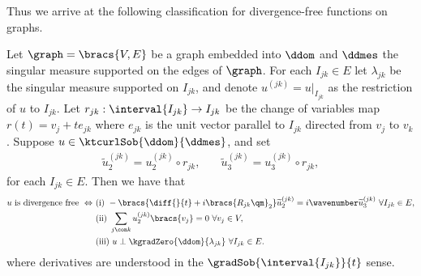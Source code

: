 Thus we arrive at the following classification for divergence-free functions on graphs.
\begin{cory} \label{cory:DivFreeWholeGraph}
	Let $\graph=\bracs{V,E}$ be a graph embedded into $\ddom$ and $\ddmes$ the singular measure supported on the edges of $\graph$.
	For each $I_{jk}\in E$ let $\lambda_{jk}$ be the singular measure supported on $I_{jk}$, and denote $u^{(jk)} = u\vert_{I_{jk}}$ as the restriction of $u$ to $I_{jk}$.
	Let $r_{jk}:\interval{I_{jk}}\rightarrow I_{jk}$ be the change of variables map $r(t)=v_{j} + te_{jk}$ where $e_{jk}$ is the unit vector parallel to $I_{jk}$ directed from $v_j$ to $v_k$.
	Suppose $u\in\ktcurlSob{\ddom}{\ddmes}$, and set 
	\begin{align*}
		\widetilde{u}^{(jk)}_2 = u^{(jk)}_2 \circ r_{jk},
		&\quad \widetilde{u}^{(jk)}_3 = u^{(jk)}_3 \circ r_{jk},
	\end{align*}
	for each $I_{jk}\in E$.
	Then we have that
	\begin{align*}
		u \text{ is divergence free } \Leftrightarrow 
		& \ \text{(i)} \ -\bracs{\diff{}{t} + i\bracs{R_{jk}\qm}_2}\widetilde{u}^{(jk)}_2 = i\wavenumber\widetilde{u}^{(jk)}_3 \ \forall I_{jk}\in E, \\
		& \ \text{(ii)} \ \sum_{j\con k}u_2^{(jk)}\bracs{v_j} = 0 \ \forall v_j\in V, \\
		& \ \text{(iii)} \ u \perp \kgradZero{\ddom}{\lambda_{jk}} \ \forall I_{jk}\in E.
	\end{align*}
	where derivatives are understood in the $\gradSob{\interval{I_{jk}}}{t}$ sense.
\end{cory}
